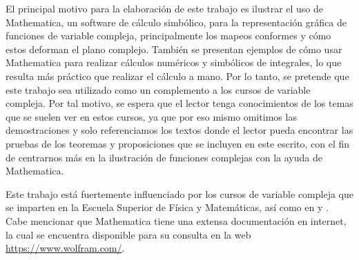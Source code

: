 \documentclass[letterpaper,12pt,openany]{book}
\theoremstyle{definition}
\theoremstyle{definition}
\theoremstyle{definition}
\theoremstyle{definition}
\theoremstyle{definition}
\theoremstyle{remark}
\theoremstyle{definition}
\begin{document}
	El principal motivo para la elaboración de este trabajo es ilustrar el uso de Mathematica, un software de cálculo simbólico, para la representación gráfica de funciones de variable compleja, principalmente los mapeos conformes y cómo estos deforman el plano complejo. También se presentan ejemplos de cómo usar Mathematica para realizar cálculos numéricos y simbólicos de integrales, lo que resulta más práctico que realizar el cálculo a mano. Por lo tanto, se pretende que este trabajo sea utilizado como un complemento a los cursos de variable compleja. Por tal motivo, se espera que el lector tenga conocimientos de los temas que se suelen ver en estos cursos, ya que por eso mismo omitimos las demostraciones y solo referenciamos los textos donde el lector pueda encontrar las pruebas de los teoremas y proposiciones que se incluyen en este escrito, con el fin de centrarnos más en la ilustración de funciones complejas con la ayuda de Mathematica.
	
	Este trabajo está fuertemente influenciado por los cursos de variable compleja que se imparten en la Escuela Superior de Física y Matemáticas, así como en \cite{shaw} y \cite{silverman}. Cabe mencionar que Mathematica tiene una extensa documentación en internet, la cual se encuentra disponible para su consulta en la web \url{https://www.wolfram.com/}.
	\mainmatter
	
	
	
	
	
	
	
	
	
	
	
%	
	
	\nocite{tarlok}
	\nocite{silverman}
	\nocite{shaw}
	\nocite{ComplexRegionPlot}
	\nocite{marsden}
	\nocite{Churchill}
	\nocite{ahlfors}
	\nocite{rajeev}
	\nocite{Driscoll}
	\nocite{Abramowitz}
	\nocite{Beta}
	\nocite{BetaInc}
	\nocite{Pearson}
	\nocite{BetaR}
	\nocite{Conway}
	\nocite{Elliptic}
	\nocite{Hypergeometric2F1}
	\nocite{ComplexPlot}
	\nocite{ComplexPlot3D}
	\nocite{ComplexContourPlot}
	\nocite{Shaw-A}
	\nocite{GeometryJo}
	\nocite{ComplexVector}
	\nocite{Domain_coloring}
	
\end{document}
